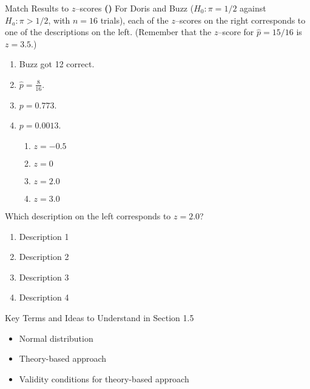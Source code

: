 \documentclass[13pt]{beamer}
\newcounter{count}
\newcommand{\question}{ \textbf{(\decimal{count})} \stepcounter{count}}
\begin{document}
\begin{frame}{Match Results to $z$--scores}
\question For Doris and Buzz ($H_0:\pi=1/2$ against $H_a:\pi>1/2$, with $n=16$ trials), each of the $z$--scores on the right corresponds to one of the descriptions on the left. (Remember that the $z$--score for $\hat{p} = 15/16$ is $z = 3.5$.)

\begin{multicols}{2}
\begin{enumerate}
   \item Buzz got 12 correct.%
   \item $\hat{p}=\frac{8}{16}$.%
   \item $p=0.773$.%
   \item $p=0.0013$.%

\begin{enumerate}
   \item $z=-0.5$
   \item $z=0$
   \item $z=2.0$
   \item $z=3.0$
\end{enumerate}
\end{enumerate}
\end{multicols}
Which description on the left corresponds to
$z=2.0$?
\begin{enumerate}[A]
   \item Description 1
   \item Description 2
   \item Description 3
   \item Description 4
\end{enumerate}

\end{frame}

\begin{frame}{Key Terms and Ideas to Understand in Section 1.5}
\begin{itemize}
	\item Normal distribution
    \item Theory-based approach
    \item Validity conditions for theory-based approach
\end{itemize}
\end{frame}
\end{document}
